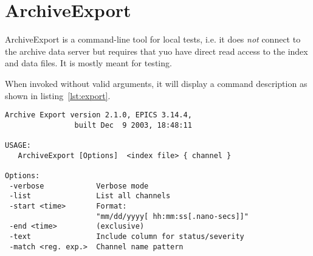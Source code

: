 \chapter{ArchiveExport}

ArchiveExport is a command-line tool for local tests, i.e. it does
\emph{not} connect to the archive data server but requires that
yuo have direct read access to the index and data files.
It is mostly meant for testing.

When invoked without valid arguments, it will display a command
description as shown in listing~\ref{lst:export}.

\begin{lstlisting}[float=htb,caption={ArchiveExport command line
help},label=lst:export,keywordstyle=\sffamily]
Archive Export version 2.1.0, EPICS 3.14.4,
                built Dec  9 2003, 18:48:11

USAGE:
   ArchiveExport [Options]  <index file> { channel }

Options:
 -verbose            Verbose mode
 -list               List all channels
 -start <time>       Format:
                     "mm/dd/yyyy[ hh:mm:ss[.nano-secs]]"
 -end <time>         (exclusive)
 -text               Include column for status/severity
 -match <reg. exp.>  Channel name pattern         
\end{lstlisting}


